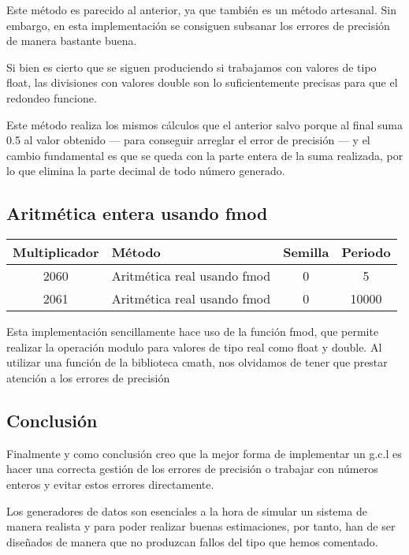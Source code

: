Este método es parecido al anterior, ya que también es un método artesanal. Sin embargo, en esta implementación se consiguen subsanar los errores de precisión de manera bastante buena.

Si bien es cierto que se siguen produciendo si trabajamos con valores de tipo float, las divisiones con valores double son lo suficientemente precisas para que el redondeo funcione.

Este método realiza los mismos cálculos que el anterior salvo porque al final suma 0.5 al valor obtenido --- para conseguir arreglar el error de precisión --- y el cambio fundamental es que se queda con la parte entera de la suma realizada, por lo que elimina la parte decimal de todo número generado.

\subsection{Aritmética entera usando fmod}
\begin{table}[H]
\centering
\begin{tabular}{|c|l|c|c|}
\hline
\textbf{Multiplicador} & \textbf{Método} & \textbf{Semilla} & \textbf{Periodo} \\ \hline
2060 & Aritmética real usando fmod & 0 & 5 \\
2061 & Aritmética real usando fmod & 0 & 10000 \\ \hline
\end{tabular}
\end{table}

Esta implementación sencillamente hace uso de la función fmod, que permite realizar la operación modulo para valores de tipo real como float y double. Al utilizar una función de la biblioteca cmath, nos olvidamos de tener que prestar atención a los errores de precisión

\subsection{Conclusión}
Finalmente y como conclusión creo que la mejor forma de implementar un g.c.l es hacer una correcta gestión de los errores de precisión o trabajar con números enteros y evitar estos errores directamente.

Los generadores de datos son esenciales a la hora de simular un sistema de manera realista y para poder realizar buenas estimaciones, por tanto, han de ser diseñados de manera que no produzcan fallos del tipo que hemos comentado.

